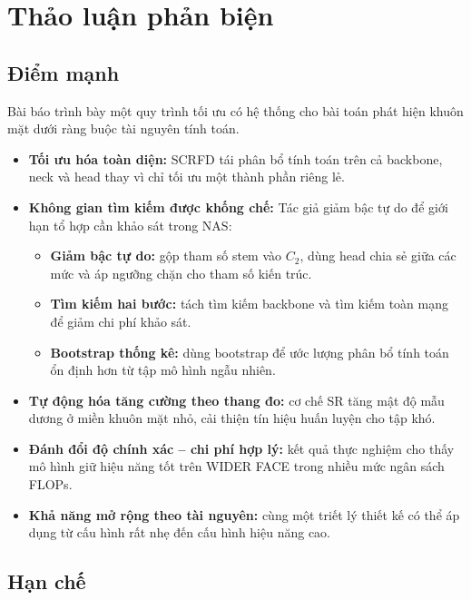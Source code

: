 \section{Thảo luận phản biện}

\subsection{Điểm mạnh}
Bài báo trình bày một quy trình tối ưu có hệ thống cho bài toán phát hiện khuôn mặt dưới ràng buộc tài nguyên tính toán.

\begin{itemize}
  \item \textbf{Tối ưu hóa toàn diện:} SCRFD tái phân bổ tính toán trên cả backbone, neck và head thay vì chỉ tối ưu một thành phần riêng lẻ.
  \item \textbf{Không gian tìm kiếm được khống chế:} Tác giả giảm bậc tự do để giới hạn tổ hợp cần khảo sát trong NAS:
  \begin{itemize}
    \item \textbf{Giảm bậc tự do:} gộp tham số stem vào $C_2$, dùng head chia sẻ giữa các mức và áp ngưỡng chặn cho tham số kiến trúc.
    \item \textbf{Tìm kiếm hai bước:} tách tìm kiếm backbone và tìm kiếm toàn mạng để giảm chi phí khảo sát.
    \item \textbf{Bootstrap thống kê:} dùng bootstrap để ước lượng phân bổ tính toán ổn định hơn từ tập mô hình ngẫu nhiên.
  \end{itemize}
  \item \textbf{Tự động hóa tăng cường theo thang đo:} cơ chế SR tăng mật độ mẫu dương ở miền khuôn mặt nhỏ, cải thiện tín hiệu huấn luyện cho tập khó.
  \item \textbf{Đánh đổi độ chính xác -- chi phí hợp lý:} kết quả thực nghiệm cho thấy mô hình giữ hiệu năng tốt trên WIDER FACE trong nhiều mức ngân sách FLOPs.
  \item \textbf{Khả năng mở rộng theo tài nguyên:} cùng một triết lý thiết kế có thể áp dụng từ cấu hình rất nhẹ đến cấu hình hiệu năng cao.
\end{itemize}

\subsection{Hạn chế}

